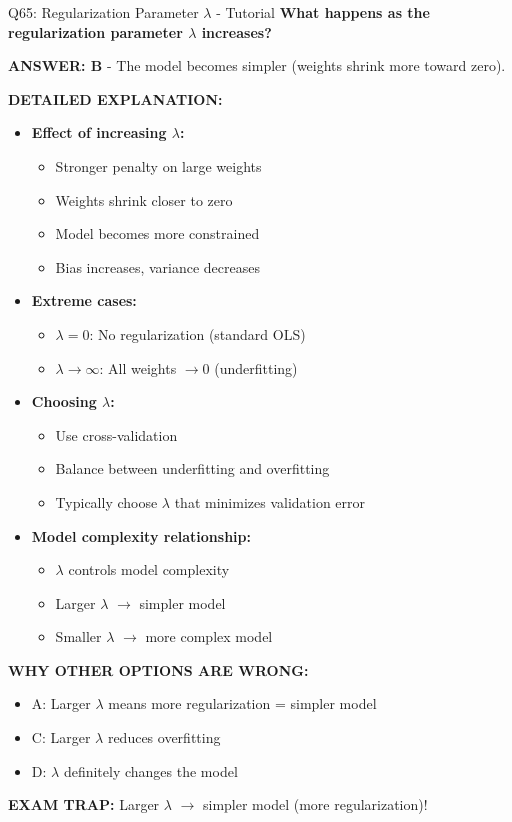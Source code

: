 \documentclass[8pt]{beamer}
\begin{document}
	\begin{frame}{Q65: Regularization Parameter $\lambda$ - Tutorial}
		\fontsize{6.5}{7.5}\selectfont
		\textbf{What happens as the regularization parameter $\lambda$ increases?}
		
		\vspace{0.05cm}
		\textcolor{myblue}{\textbf{ANSWER: B}} - The model becomes simpler (weights shrink more toward zero).
		
		\vspace{0.05cm}
		\textbf{DETAILED EXPLANATION:}
		\begin{itemize}
			\item \textbf{Effect of increasing $\lambda$:}
			\begin{itemize}
				\item Stronger penalty on large weights
				\item Weights shrink closer to zero
				\item Model becomes more constrained
				\item Bias increases, variance decreases
			\end{itemize}
			\item \textbf{Extreme cases:}
			\begin{itemize}
				\item $\lambda = 0$: No regularization (standard OLS)
				\item $\lambda \to \infty$: All weights $\to 0$ (underfitting)
			\end{itemize}
			\item \textbf{Choosing $\lambda$:}
			\begin{itemize}
				\item Use cross-validation
				\item Balance between underfitting and overfitting
				\item Typically choose $\lambda$ that minimizes validation error
			\end{itemize}
			\item \textbf{Model complexity relationship:}
			\begin{itemize}
				\item $\lambda$ controls model complexity
				\item Larger $\lambda$ $\to$ simpler model
				\item Smaller $\lambda$ $\to$ more complex model
			\end{itemize}
		\end{itemize}
		
		\vspace{0.05cm}
		\textcolor{myred}{\textbf{WHY OTHER OPTIONS ARE WRONG:}}
		\begin{itemize}
			\item \textcolor{myred}{A:} Larger $\lambda$ means more regularization = simpler model
			\item \textcolor{myred}{C:} Larger $\lambda$ reduces overfitting
			\item \textcolor{myred}{D:} $\lambda$ definitely changes the model
		\end{itemize}
		
		\textcolor{myred}{\textbf{EXAM TRAP:}} Larger $\lambda$ $\to$ simpler model (more regularization)!
	\end{frame}
\end{document}
